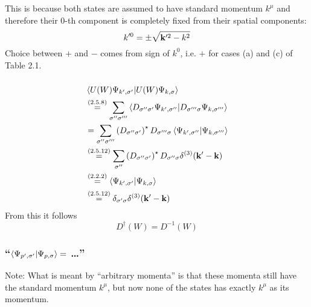 This is because both states are assumed to have standard momentum $k^\mu$ and therefore their 0-th component is completely fixed from their spatial components:
\[k^{\prime 0}=\pm \sqrt{\mathbf{k}^{\prime 2}-k^2}\]
Choice between $+$ and $-$ comes from sign of $k^0$, i.e. $+$ for cases (a) and (c) of Table 2.1.
\subsubsection{ }
\begin{align*} 
	&\braket{U(W)\Psi_{k^\prime,\sigma^\prime}}{U(W)\Psi_{k,\sigma}}\\
	&\overset{({2.5.8})}{=}\sum\limits_{\sigma^{\prime\prime}\sigma^{\prime\prime\prime}}\braket{D_{\sigma^{\prime\prime} \sigma^{\prime}}\Psi_{k^\prime,\sigma^{\prime\prime}}}{D_{\sigma^{\prime\prime\prime} \sigma}\Psi_{k,\sigma^{\prime\prime\prime}}}\\
	&=\sum\limits_{\sigma^{\prime\prime}\sigma^{\prime\prime\prime}}\left(D_{\sigma^{\prime\prime} \sigma^{\prime}}\right)^\star D_{\sigma^{\prime\prime\prime} \sigma} \braket{\Psi_{k^\prime,\sigma^{\prime\prime}}}{\Psi_{k,\sigma^{\prime\prime\prime}}}\\
	&\overset{({2.5.12})}{=}\sum\limits_{\sigma^{\prime\prime}}\left(D_{\sigma^{\prime\prime} \sigma^{\prime}}\right)^\star D_{\sigma^{\prime\prime} \sigma} \delta^{(3)}(\mathbf{k}^\prime- \mathbf{k})\\
	&\overset{({2.2.2})}{=}\braket{\Psi_{k^\prime,\sigma^\prime}}{\Psi_{k,\sigma}}\\
	&\overset{({2.5.12})}{=} \delta_{\sigma^\prime \sigma} \delta^{(3)}(\mathbf{k}^\prime- \mathbf{k})
\end{align*}
From this it follows \[D^\dagger(W)=D^{-1}(W)\]

\subsubsection{\enquote{$\braket{\Psi_{p^\prime,\sigma^\prime}}{\Psi_{p,\sigma}}=$ \dots} }
{\color{red}Note:} What is meant by \enquote{arbitrary momenta} is that these momenta still have the standard momentum $k^\mu$, but now none of the states has exactly $k^\mu$ as its momentum.

